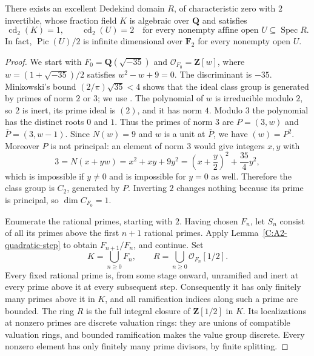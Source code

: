 \begin{theorem}[Counterexample to A.2]
\label{C:A2-persistent-arithmetic-counterexample}
There exists an excellent Dedekind domain $R$, of characteristic
zero with $2$ invertible, whose fraction field $K$ is algebraic
over $\mathbf Q$ and satisfies
\[
 \operatorname{cd}_2(K)=1,
 \qquad
 \operatorname{cd}_2(U)=2
 \quad\text{for every nonempty affine open }U\subseteq\operatorname{Spec}R.
\]
In fact, $\operatorname{Pic}(U)/2$ is infinite dimensional over
$\mathbf F_2$ for every nonempty open $U$.
\end{theorem}
\begin{proof}
We start with $F_0=\mathbf Q(\sqrt{-35})$ and
$\mathcal O_{F_0}=\mathbf Z[w]$, where
$w=(1+\sqrt{-35})/2$ satisfies $w^2-w+9=0$.
The discriminant is $-35$. Minkowski's bound
$(2/\pi)\sqrt{35}<4$ shows that the ideal class group is
generated by primes of norm $2$ or $3$; we use
\cite[Section 4, Theorem 4.3, pp.~70--71]{C_MilneANT2020}.
The polynomial of $w$ is irreducible modulo $2$, so $2$ is
inert, its prime ideal is $(2)$, and it has norm $4$.
Modulo $3$ the polynomial has the distinct roots $0$ and $1$.
Thus the primes of norm $3$ are
$P=(3,w)$ and $\overline P=(3,w-1)$. Since $N(w)=9$ and
$w$ is a unit at $\overline P$, we have $(w)=P^2$.
Moreover $P$ is not principal: an element of norm $3$ would
give integers $x,y$ with
\[
 3=N(x+yw)=x^2+xy+9y^2
       =\left(x+\frac y2\right)^2+\frac{35}4y^2,
\]
which is impossible if $y\ne0$ and is impossible for $y=0$
as well. Therefore the class group is $C_2$, generated by
$P$. Inverting $2$ changes nothing because its prime is
principal, so $\dim C_{F_0}=1$.

Enumerate the rational primes, starting with $2$. Having chosen
$F_n$, let $S_n$ consist of all its primes above the first $n+1$
rational primes. Apply Lemma~\ref{C:A2-quadratic-step} to obtain
$F_{n+1}/F_n$, and continue. Set
\[
 K=\bigcup_{n\ge0}F_n,
 \qquad R=\bigcup_{n\ge0}\mathcal O_{F_n}[1/2].
\]
Every fixed rational prime is, from some stage onward, unramified
and inert at every prime above it at every subsequent step.
Consequently it has only finitely many primes above it in $K$,
and all ramification indices along such a prime are bounded.
The ring $R$ is the full integral closure of $\mathbf Z[1/2]$
in $K$. Its localizations at nonzero primes are discrete valuation
rings: they are unions of compatible valuation rings, and bounded
ramification makes the value group discrete. Every nonzero element
has only finitely many prime divisors, by finite splitting.


\end{proof}

